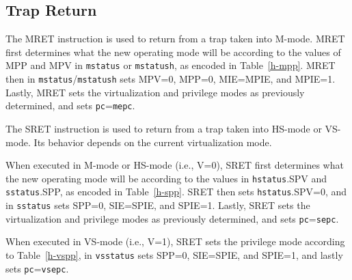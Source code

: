 \subsection{Trap Return}

The MRET instruction is used to return from a trap taken into M-mode.
MRET first determines what the new operating mode will be according to
the values of MPP and MPV in {\tt mstatus} or {\tt mstatush}, as encoded in
Table~\ref{h-mpp}.
MRET then in {\tt mstatus}/{\tt mstatush} sets MPV=0, MPP=0, MIE=MPIE, and MPIE=1.
Lastly, MRET sets the virtualization and privilege modes as previously
determined, and sets {\tt pc}={\tt mepc}.

The SRET instruction is used to return from a trap taken into HS-mode or
VS-mode.  Its behavior depends on the current virtualization mode.

When executed in M-mode or HS-mode (i.e., V=0), SRET first determines
what the new operating mode will be according to the values in
{\tt hstatus}.SPV and {\tt sstatus}.SPP, as encoded in Table~\ref{h-spp}.
SRET then sets {\tt hstatus}.SPV=0, and in {\tt sstatus} sets SPP=0,
SIE=SPIE, and SPIE=1.
Lastly, SRET sets the virtualization and privilege modes as previously
determined, and sets {\tt pc}={\tt sepc}.

When executed in VS-mode (i.e., V=1), SRET sets the privilege mode according to
Table~\ref{h-vspp}, in {\tt vsstatus} sets SPP=0, SIE=SPIE, and SPIE=1, and
lastly sets {\tt pc}={\tt vsepc}.
